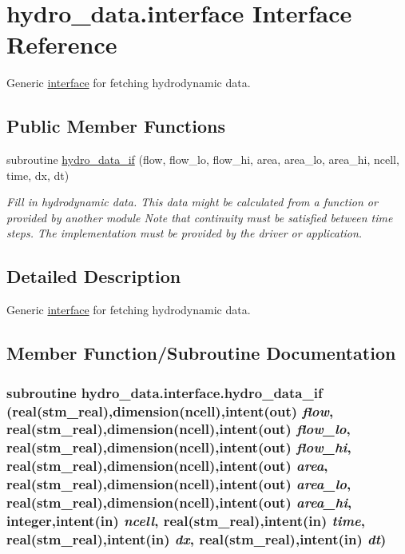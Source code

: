 \hypertarget{a00001}{
\section{hydro\_\-data.interface Interface Reference}
\label{a00001}
}
Generic \hyperlink{a00001}{interface} for fetching hydrodynamic data.  


\subsection*{Public Member Functions}
\begin{CompactItemize}
\item 
subroutine \hyperlink{a00001_5a0e84de2b65341622690c563dbda3b9}{hydro\_\-data\_\-if} (flow, flow\_\-lo, flow\_\-hi, area, area\_\-lo, area\_\-hi, ncell, time, dx, dt)
\begin{CompactList}\small\item\em Fill in hydrodynamic data. This data might be calculated from a function or provided by another module Note that continuity must be satisfied between time steps. The implementation must be provided by the driver or application. \item\end{CompactList}\end{CompactItemize}


\subsection{Detailed Description}
Generic \hyperlink{a00001}{interface} for fetching hydrodynamic data. 

\subsection{Member Function/Subroutine Documentation}
\hypertarget{a00001_5a0e84de2b65341622690c563dbda3b9}{
\subsubsection[{hydro\_\-data\_\-if}]{\setlength{\rightskip}{0pt plus 5cm}subroutine hydro\_\-data.interface.hydro\_\-data\_\-if (real(stm\_\-real),dimension(ncell),intent(out) {\em flow}, \/  real(stm\_\-real),dimension(ncell),intent(out) {\em flow\_\-lo}, \/  real(stm\_\-real),dimension(ncell),intent(out) {\em flow\_\-hi}, \/  real(stm\_\-real),dimension(ncell),intent(out) {\em area}, \/  real(stm\_\-real),dimension(ncell),intent(out) {\em area\_\-lo}, \/  real(stm\_\-real),dimension(ncell),intent(out) {\em area\_\-hi}, \/  integer,intent(in) {\em ncell}, \/  real(stm\_\-real),intent(in) {\em time}, \/  real(stm\_\-real),intent(in) {\em dx}, \/  real(stm\_\-real),intent(in) {\em dt})}}
\label{a00001_5a0e84de2b65341622690c563dbda3b9}


